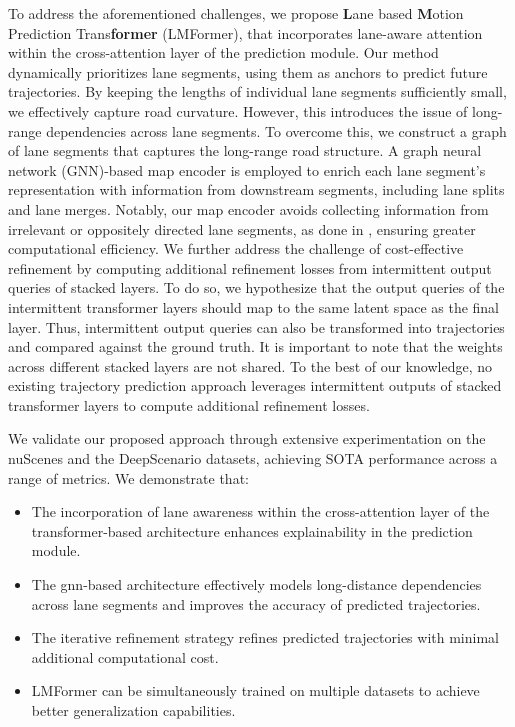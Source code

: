 To address the aforementioned challenges, we propose \textbf{L}ane based \textbf{M}otion Prediction Trans\textbf{former} (LMFormer), that incorporates lane-aware attention within the cross-attention layer of the prediction module. Our method dynamically prioritizes lane segments, using them as anchors to predict future trajectories. By keeping the lengths of individual lane segments sufficiently small, we effectively capture road curvature. However, this introduces the issue of long-range dependencies across lane segments. To overcome this, we construct a graph of lane segments that captures the long-range road structure. A graph neural network (GNN)-based map encoder is employed to enrich each lane segment's representation with information from downstream segments, including lane splits and lane merges. Notably, our map encoder avoids collecting information from irrelevant or oppositely directed lane segments, as done in \cite{liang2020learning}, ensuring greater computational efficiency. We further address the challenge of cost-effective refinement by computing additional refinement losses from intermittent output queries of stacked layers. To do so, we hypothesize that the output queries of the intermittent transformer layers should map to the same latent space as the final layer. Thus, intermittent output queries can also be transformed into trajectories and compared against the ground truth. It is important to note that the weights across different stacked layers are not shared. To the best of our knowledge, no existing trajectory prediction approach leverages intermittent outputs of stacked transformer layers to compute additional refinement losses.

We validate our proposed approach through extensive experimentation on the nuScenes \cite{caesar2020nuscenes} and the DeepScenario \cite{lu2023deepscenario} datasets, achieving SOTA performance across a range of metrics. We demonstrate that:

\begin{itemize}
    \item The incorporation of lane awareness within the cross-attention layer of the transformer-based architecture enhances explainability in the prediction module.
    \item The \ac{gnn}-based architecture effectively models long-distance dependencies across lane segments and improves the accuracy of predicted trajectories.
    \item The iterative refinement strategy refines predicted trajectories with minimal additional computational cost.
    \item LMFormer can be simultaneously trained on multiple datasets to achieve better generalization capabilities.
\end{itemize}